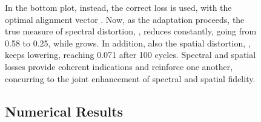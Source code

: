 \documentclass[journal]{IEEEtran}
\begin{document}
\begin{figure}
In the bottom plot, instead, the correct loss is used, with the optimal alignment vector .
Now, as the adaptation proceeds, the true measure of spectral distortion, , reduces constantly, going from 0.58 to 0.25,
while  grows.
In addition, also the spatial distortion, , keeps lowering, reaching 0.071 after 100 cycles.
Spectral and spatial losses provide coherent indications and reinforce one another, concurring to the joint enhancement of spectral and spatial fidelity.

\subsection{Numerical Results}

\newcommand{\za}[1]{\textbf{#1}}
\newcommand{\zb}[1]{\underline{#1}}
\newcommand{\zr}{\rule{0mm}{3.5mm}}


\end{figure}
\end{document}
